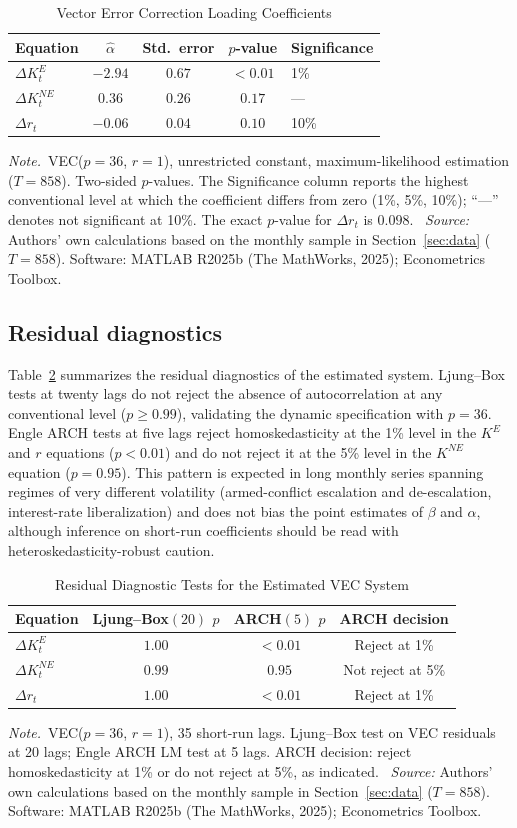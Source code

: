 \documentclass[ecta,nameyear,final,supplement]{econsocart}
\numberwithin{equation}{section}
\numberwithin{table}{section}
\theoremstyle{definition}
\newcommand{\KE}{K^{E}}
\newcommand{\KNE}{K^{NE}}
\newcommand{\tabnote}{\par\addvspace{0.4em}\noindent\emph{Note.}}
\newcommand{\tabsource}{\ \textit{Source:} Authors' own calculations based on
the monthly sample in Section~\ref{sec:data} ($T=858$). Software: MATLAB
R2025b (The MathWorks, 2025); Econometrics Toolbox.}
\begin{document}
\begin{table}[t]
\centering
\caption{Vector Error Correction Loading Coefficients}
\label{tab:alpha}
\begin{tabular}{lcccl}
\toprule
Equation & $\hat\alpha$ & Std.\ error & $p$-value & Significance \\
\midrule
$\Delta \KE_t$  & $-2.94$ & $0.67$ & $<0.01$ & 1\% \\
$\Delta \KNE_t$ & $0.36$  & $0.26$ & $0.17$  & --- \\
$\Delta r_t$    & $-0.06$ & $0.04$ & $0.10$  & 10\% \\
\bottomrule
\end{tabular}
\tabnote\ VEC($p=36$, $r=1$), unrestricted constant, maximum-likelihood
estimation ($T=858$). Two-sided $p$-values. The Significance column reports
the highest conventional level at which the coefficient differs from zero
(1\%, 5\%, 10\%); ``---'' denotes not significant at 10\%. The exact
$p$-value for $\Delta r_t$ is $0.098$.
\tabsource
\end{table}

\subsection{Residual diagnostics}
\label{sec:diagnostics}

Table~\ref{tab:diagnostics} summarizes the residual diagnostics of the
estimated system. Ljung--Box tests at twenty lags do not reject the absence
of autocorrelation at any conventional level ($p\ge 0.99$), validating the
dynamic specification with $p=36$. Engle ARCH tests at five lags reject
homoskedasticity at the 1\% level in the $\KE$ and $r$ equations
($p<0.01$) and do not reject it at the 5\% level in the $\KNE$ equation
($p=0.95$). This pattern is expected in long monthly series spanning regimes
of very different volatility (armed-conflict escalation and de-escalation,
interest-rate liberalization) and does not bias the point estimates of
$\beta$ and $\alpha$, although inference on short-run coefficients should be
read with heteroskedasticity-robust caution.

\begin{table}[t]
\centering
\caption{Residual Diagnostic Tests for the Estimated VEC System}
\label{tab:diagnostics}
\begin{tabular}{lccc}
\toprule
Equation & Ljung--Box$(20)$ $p$ & ARCH$(5)$ $p$ & ARCH decision \\
\midrule
$\Delta \KE_t$  & $1.00$ & $<0.01$ & Reject at 1\% \\
$\Delta \KNE_t$ & $0.99$ & $0.95$  & Not reject at 5\% \\
$\Delta r_t$    & $1.00$ & $<0.01$ & Reject at 1\% \\
\bottomrule
\end{tabular}
\tabnote\ VEC($p=36$, $r=1$), 35 short-run lags. Ljung--Box test on VEC
residuals at 20 lags; Engle ARCH LM test at 5 lags. ARCH decision: reject
homoskedasticity at 1\% or do not reject at 5\%, as indicated.
\tabsource
\end{table}
\end{document}
